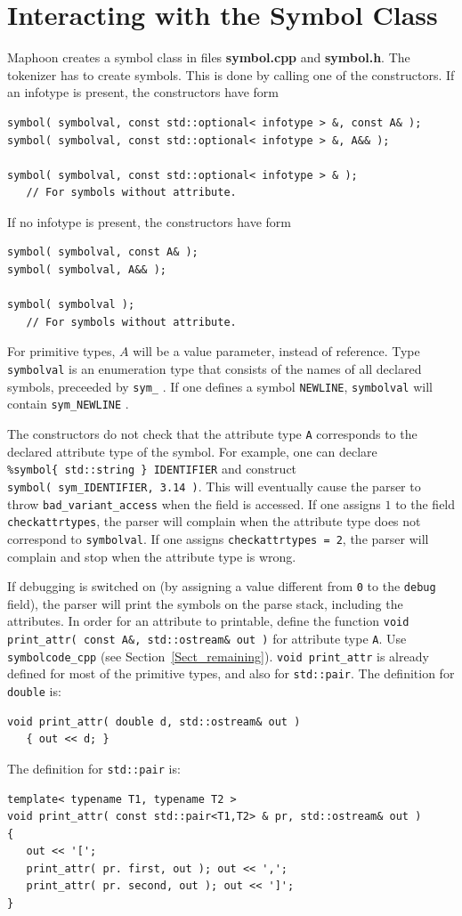 \documentclass{article}
\begin{document}
\section{Interacting with the Symbol Class}

Maphoon creates a symbol class in files
{\bf symbol.cpp} and {\bf symbol.h}.
The tokenizer has to create symbols. 
This is done by calling one of the constructors.
If an infotype is present, the constructors have form
\begin{verbatim}
symbol( symbolval, const std::optional< infotype > &, const A& );
symbol( symbolval, const std::optional< infotype > &, A&& ); 

symbol( symbolval, const std::optional< infotype > & );
   // For symbols without attribute. \end{verbatim}
If no infotype is present, the constructors have form
\begin{verbatim}
symbol( symbolval, const A& );
symbol( symbolval, A&& ); 

symbol( symbolval );
   // For symbols without attribute. \end{verbatim}
For primitive types, $ A $ will be a value parameter,
instead of reference. 
Type \verb+symbolval+ is an enumeration type that
consists of the names of all declared symbols, preceeded
by \verb+sym_+ . If one defines a symbol \verb+NEWLINE+,  
\verb+symbolval+ will contain \verb+sym_NEWLINE+  .

The constructors do not check that the attribute type 
\verb+A+ corresponds to the declared attribute type of
the symbol. 
For example, one can declare \\
\verb+%symbol{ std::string } IDENTIFIER+ 
and construct \\ \verb+symbol( sym_IDENTIFIER, 3.14 )+.
This will eventually cause the parser to throw 
\verb+bad_variant_access+ when the field is accessed.
If one assigns $ 1 $ to the field \verb+checkattrtypes+, the parser
will complain 
when the attribute type does not correspond
to \verb+symbolval+. If one assigns
\verb+checkattrtypes = 2+, the parser will complain and stop when
the attribute type is wrong.

If debugging is switched on (by assigning a value
different from \verb+0+ to the \verb+debug+ field), 
the parser will print the symbols on the parse stack, including the attributes.
In order for an attribute to printable, define the function
\verb+void print_attr( const A&, std::ostream& out )+ 
for attribute type \verb+A+.
Use \verb+symbolcode_cpp+ (see Section~\ref{Sect_remaining}). 
\verb+void print_attr+ is already defined for most of the primitive types, 
and also for \verb+std::pair+.
The definition for \verb+double+ is:
\begin{verbatim}
void print_attr( double d, std::ostream& out )
   { out << d; } \end{verbatim}
The definition for \verb+std::pair+ is: 
\begin{verbatim}
template< typename T1, typename T2 > 
void print_attr( const std::pair<T1,T2> & pr, std::ostream& out )
{
   out << '[';
   print_attr( pr. first, out ); out << ',';
   print_attr( pr. second, out ); out << ']';
} \end{verbatim}
\end{document}
